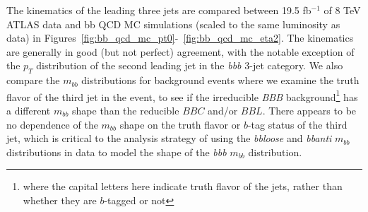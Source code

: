 The kinematics of the leading three jets are compared between 19.5 fb$^{-1}$ of 8 TeV 
ATLAS data and bb QCD MC simulations (scaled to the same luminosity as data) in 
Figures~\ref{fig:bb_qcd_mc_pt0}-~\ref{fig:bb_qcd_mc_eta2}.  The kinematics are
generally in good (but not perfect) agreement, with the notable exception of the
$p_T$ distribution of the second leading jet in the \textit{bbb} 3-jet category.
We also compare the $m_{bb}$ distributions for background events where we 
examine the truth flavor of the third jet in the event, to see if the irreducible
\textit{BBB} background\footnote{where the capital letters here indicate truth flavor
of the jets, rather than whether they are $b$-tagged or not} has a different
$m_{bb}$ shape than the reducible $BBC$ and/or $BBL$.  There appears to be
no dependence of the $m_{bb}$ shape on the truth flavor or $b$-tag status of the third jet, which
is critical to the analysis strategy of using the
\textit{bbloose} and \textit{bbanti} $m_{bb}$ distributions in data to 
model the shape of the \textit{bbb} $m_{bb}$ distribution.


